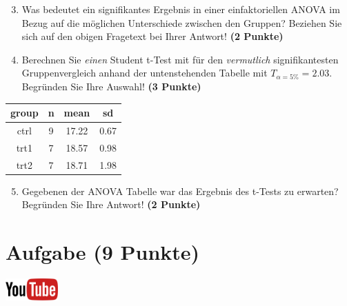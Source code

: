 \documentclass[a4paper, 10pt]{scrartcl}\usepackage[]{graphicx}\usepackage[]{xcolor}
\newenvironment{knitrout}{}{} %
\begin{document}
\vspace{1Ex}

\begin{enumerate}
  \setcounter{enumi}{2}
\item Was bedeutet ein signifikantes Ergebnis in einer einfaktoriellen
  ANOVA im Bezug auf die m{\"o}glichen Unterschiede zwischen den Gruppen? Beziehen Sie sich auf den obigen Fragetext bei Ihrer Antwort!
  \textbf{(2 Punkte)}
\item Berechnen Sie \textit{einen} Student t-Test mit f{\"u}r den \textit{vermutlich}
  signifikantesten Gruppenvergleich anhand der untenstehenden Tabelle mit
  $T_{\alpha = 5\%} = 2.03$. Begr{\"u}nden Sie Ihre Auswahl! \textbf{(3 Punkte)}
\end{enumerate}

\begin{knitrout}
\color{fgcolor}\begin{table}[!h]
\centering
\begin{tabular}{cccc}
\toprule
group & n & mean & sd\\
\midrule
ctrl & 9 & 17.22 & 0.67\\
trt1 & 7 & 18.57 & 0.98\\
trt2 & 7 & 18.71 & 1.98\\
\bottomrule
\end{tabular}
\end{table}

\end{knitrout}

\begin{enumerate}
  \setcounter{enumi}{4}
\item Gegebenen der ANOVA Tabelle war das Ergebnis des t-Tests zu erwarten?
  Begr{\"u}nden Sie Ihre Antwort! \textbf{(2 Punkte)}
\end{enumerate}

 
\clearpage

\section{Aufgabe \hfill (9 Punkte)}

\hfill\href{https://youtu.be/d4CFR2MKX7I}{\includegraphics[width =
  2cm]{img/youtube}}\\[1Ex]
\end{document}
